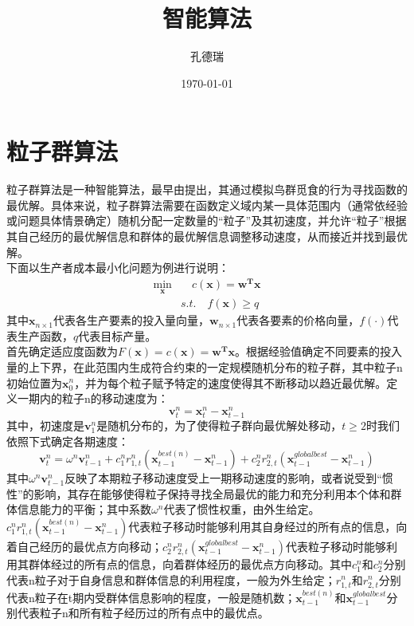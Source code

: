 \documentclass[11pt,a4paper]{article}
\title{智能算法}
\author{孔德瑞}
\date{\today}
\begin{document}
\maketitle

\newpage
\section{粒子群算法}

粒子群算法是一种智能算法，最早由\textcite{RN5870}提出，其通过模拟鸟群觅食的行为寻找函数的最优解。具体来说，粒子群算法需要在函数定义域内某一具体范围内（通常依经验或问题具体情景确定）随机分配一定数量的“粒子”及其初速度，并允许“粒子”根据其自己经历的最优解信息和群体的最优解信息调整移动速度，从而接近并找到最优解。\\

下面以生产者成本最小化问题为例进行说明：
\begin{equation}\label{eqcmp}
\begin{aligned}
	\min_{\mathbf{x}} &\quad c(\mathbf{x})=\mathbf{w^T x}\\
	&s.t. \quad f(\mathbf{x}) \geq q 
\end{aligned}
\end{equation}
其中$\mathbf{x}_{n\times1}$代表各生产要素的投入量向量，$\mathbf{w}_{n\times1}$代表各要素的价格向量，$f(·)$代表生产函数，$q$代表目标产量。\\

首先确定适应度函数为$F(\mathbf{x})=c(\mathbf{x})=\mathbf{w^T x}$。根据经验值确定不同要素的投入量的上下界，在此范围内生成符合约束的一定规模随机分布的粒子群，其中粒子n初始位置为$\mathbf{x}^n_0$，并为每个粒子赋予特定的速度使得其不断移动以趋近最优解。定义一期内的粒子n的移动速度为：
\begin{equation}\label{eqvdef}
    \mathbf{v}^n_{t}=\mathbf{x}^n_{t}-\mathbf{x}^n_{t-1}
\end{equation}
其中，初速度是$\mathbf{v}^n_{1}$是随机分布的，为了使得粒子群向最优解处移动，$t \geq 2$时我们依照下式确定各期速度：
\begin{equation}\label{eqvcal}
    \mathbf{v}^n_{t}=\omega^n\mathbf{v}^n_{t-1}+c^n_{1}r^n_{1,t}(\mathbf{x}^{best(n)}_{t-1}-\mathbf{x}^n_{t-1})+c^n_{2}r^n_{2,t}(\mathbf{x}^{globalbest}_{t-1}-\mathbf{x}^n_{t-1})
\end{equation}
其中$\omega^n\mathbf{v}^n_{t-1}$反映了本期粒子移动速度受上一期移动速度的影响，或者说受到“惯性”的影响，其存在能够使得粒子保持寻找全局最优的能力和充分利用本个体和群体信息能力的平衡；其中系数$\omega^n$代表了惯性权重，由外生给定。$c^n_{1}r^n_{1,t}(\mathbf{x}^{best(n)}_{t-1}-\mathbf{x}^n_{t-1})$代表粒子移动时能够利用其自身经过的所有点的信息，向着自己经历的最优点方向移动；$c^n_{2}r^n_{2,t}(\mathbf{x}^{globalbest}_{t-1}-\mathbf{x}^n_{t-1})$代表粒子移动时能够利用其群体经过的所有点的信息，向着群体经历的最优点方向移动。其中$c^n_{1}$和$c^n_{2}$分别代表n粒子对于自身信息和群体信息的利用程度，一般为外生给定；$r^n_{1,t}$和$r^n_{2,t}$分别代表n粒子在t期内受群体信息影响的程度，一般是随机数；$\mathbf{x}^{best(n)}_{t-1}$和$\mathbf{x}^{globalbest}_{t-1}$分别代表粒子n和所有粒子经历过的所有点中的最优点。\\
\end{document}
